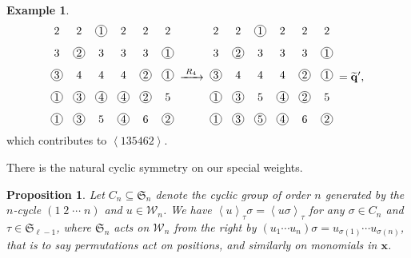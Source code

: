 \documentclass[reqno]{amsart}
\newcommand{\0}{\phantom{c}}
\newcommand{\swt}[1]{\left\langle #1 \right\rangle} %
\newcommand{\SymGp}[1]{\mathfrak{S}_{#1}} %
\newcommand{\xx}{\mathbf{x}}
\newcommand{\qq}{\mathbf{q}}
\newcommand{\mcW}{\mathcal{W}}
\theoremstyle{plain}
\newtheorem{prop}[thm]{Proposition}
\theoremstyle{definition}
\newtheorem{example}[thm]{Example}
\numberwithin{equation}{section}
\begin{document}
\begin{example}
\begin{align*}
\begin{tikzpicture}[xscale=0.7,yscale=0.7,every node/.style={inner sep=0.8pt},baseline=55]
\node at (0, 5){2};\node at (1, 5){2};\node[circle, draw=black] at (2, 5){1};\node at (3, 5){2};\node at (4, 5){2};\node at (5, 5){2};\node at (0, 4){3};\node[circle, draw=black] at (1, 4){2};\node at (2, 4){3};\node at (3, 4){3};\node at (4, 4){3};\node[circle, draw=black] at (5, 4){1};\node[circle, draw=black] at (0, 3){3};\node at (1, 3){4};\node at (2, 3){4};\node at (3, 3){4};\node[circle, draw=black] at (4, 3){2};\node[circle, draw=black] at (5, 3){1};\node[circle, draw=black] at (0, 2){1};\node[circle, draw=black] at (1, 2){3};\node[circle, draw=black] at (2, 2){4};\node[circle, draw=black] at (3, 2){4};\node[circle, draw=black] at (4, 2){2};\node at (5, 2){5};\node[circle, draw=black] at (0, 1){1};\node[circle, draw=black] at (1, 1){3};\node at (2, 1){5};\node[circle, draw=black] at (3, 1){4};\node at (4, 1){6};\node[circle, draw=black] at (5, 1){2};\end{tikzpicture}
\; \xrightarrow[\hspace{15pt}]{R_4} \;
\begin{tikzpicture}[xscale=0.7,yscale=0.7,every node/.style={inner sep=0.8pt},baseline=55]
\node at (0, 5){2};\node at (1, 5){2};\node[circle, draw=black] at (2, 5){1};\node at (3, 5){2};\node at (4, 5){2};\node at (5, 5){2};\node at (0, 4){3};\node[circle, draw=black] at (1, 4){2};\node at (2, 4){3};\node at (3, 4){3};\node at (4, 4){3};\node[circle, draw=black] at (5, 4){1};\node[circle, draw=black] at (0, 3){3};\node at (1, 3){4};\node at (2, 3){4};\node at (3, 3){4};\node[circle, draw=black] at (4, 3){2};\node[circle, draw=black] at (5, 3){1};\node[circle, draw=black] at (0, 2){1};\node[circle, draw=black] at (1, 2){3};\node at (2, 2){5};\node[circle, draw=black] at (3, 2){4};\node[circle, draw=black] at (4, 2){2};\node at (5, 2){5};\node[circle, draw=black] at (0, 1){1};\node[circle, draw=black] at (1, 1){3};\node[circle, draw=black] at (2, 1){5};\node[circle, draw=black] at (3, 1){4};\node at (4, 1){6};\node[circle, draw=black] at (5, 1){2};
\end{tikzpicture}
\; = \widetilde{\qq}',
\end{align*}
which contributes to $\swt{135462}$.
\end{example}

There is the natural cyclic symmetry on our special weights.

\begin{prop}
  Let $C_n \subseteq \SymGp{n}$ denote the cyclic group of order $n$ generated by the $n$-cycle $(1 \; 2 \; \dotsm \; n)$ and $u \in \mcW_n$.
  We have $\swt{u}_{\tau}\sigma = \swt{u \sigma}_{\tau}$ for any $\sigma \in C_n$ and $\tau \in \SymGp{\ell-1}$, where $\SymGp{n}$ acts on $\mcW_n$ from the right by $(u_1 \dotsm u_n) \sigma = u_{\sigma(1)} \dotsm u_{\sigma(n)}$, that is to say permutations act on positions, and similarly on monomials in $\xx$.
\end{prop}
\end{document}
